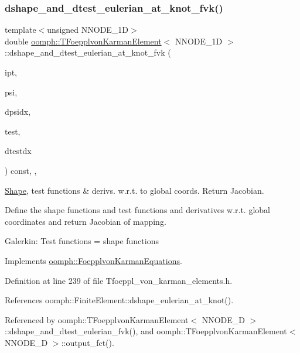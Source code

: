 \subsubsection{\texorpdfstring{dshape\+\_\+and\+\_\+dtest\+\_\+eulerian\+\_\+at\+\_\+knot\+\_\+fvk()}{dshape\_and\_dtest\_eulerian\_at\_knot\_fvk()}}
{\footnotesize\ttfamily template$<$unsigned N\+N\+O\+D\+E\+\_\+1D$>$ \\
double \hyperlink{classoomph_1_1TFoepplvonKarmanElement}{oomph\+::\+T\+Foepplvon\+Karman\+Element}$<$ N\+N\+O\+D\+E\+\_\+1D $>$\+::dshape\+\_\+and\+\_\+dtest\+\_\+eulerian\+\_\+at\+\_\+knot\+\_\+fvk (\begin{DoxyParamCaption}\item[{const unsigned \&}]{ipt,  }\item[{\hyperlink{classoomph_1_1Shape}{Shape} \&}]{psi,  }\item[{\hyperlink{classoomph_1_1DShape}{D\+Shape} \&}]{dpsidx,  }\item[{\hyperlink{classoomph_1_1Shape}{Shape} \&}]{test,  }\item[{\hyperlink{classoomph_1_1DShape}{D\+Shape} \&}]{dtestdx }\end{DoxyParamCaption}) const\hspace{0.3cm}{\ttfamily [inline]}, {\ttfamily [protected]}, {\ttfamily [virtual]}}



\hyperlink{classoomph_1_1Shape}{Shape}, test functions \& derivs. w.\+r.\+t. to global coords. Return Jacobian. 

Define the shape functions and test functions and derivatives w.\+r.\+t. global coordinates and return Jacobian of mapping.

Galerkin\+: Test functions = shape functions 

Implements \hyperlink{classoomph_1_1FoepplvonKarmanEquations_aab91609ffb4a1ae2ae32ef7cb44f887e}{oomph\+::\+Foepplvon\+Karman\+Equations}.



Definition at line 239 of file Tfoeppl\+\_\+von\+\_\+karman\+\_\+elements.\+h.



References oomph\+::\+Finite\+Element\+::dshape\+\_\+eulerian\+\_\+at\+\_\+knot().



Referenced by oomph\+::\+T\+Foepplvon\+Karman\+Element$<$ N\+N\+O\+D\+E\+\_\+D $>$\+::dshape\+\_\+and\+\_\+dtest\+\_\+eulerian\+\_\+fvk(), and oomph\+::\+T\+Foepplvon\+Karman\+Element$<$ N\+N\+O\+D\+E\+\_\+D $>$\+::output\+\_\+fct().

